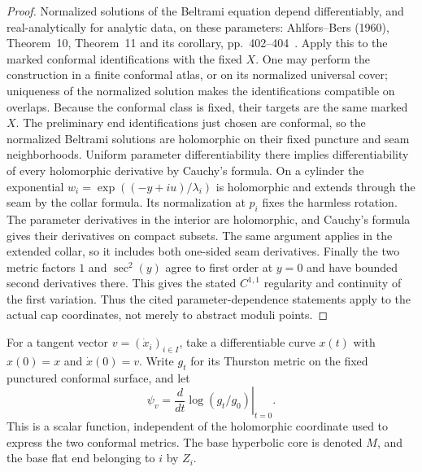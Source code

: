 \begin{proof}
Normalized solutions of the Beltrami equation depend differentiably, and real-analytically for analytic data, on these parameters: Ahlfors--Bers (1960), Theorem~10, Theorem~11 and its corollary, pp.~402--404~\cite{C_AhlforsBers1960}. Apply this to the marked conformal identifications with the fixed $X$. One may perform the construction in a finite conformal atlas, or on its normalized universal cover; uniqueness of the normalized solution makes the identifications compatible on overlaps. Because the conformal class is fixed, their targets are the same marked $X$. The preliminary end identifications just chosen are conformal, so the normalized Beltrami solutions are holomorphic on their fixed puncture and seam neighborhoods. Uniform parameter differentiability there implies differentiability of every holomorphic derivative by Cauchy's formula. On a cylinder the exponential
$w_i=\exp((-y+iu)/\lambda_i)$ is holomorphic and extends through the seam by the collar formula. Its normalization at $p_i$ fixes the harmless rotation. The parameter derivatives in the interior are holomorphic, and Cauchy's formula gives their derivatives on compact subsets. The same argument applies in the extended collar, so it includes both one-sided seam derivatives. Finally the two metric factors $1$ and $\sec^2(y)$ agree to first order at $y=0$ and have bounded second derivatives there. This gives the stated $C^{1,1}$ regularity and continuity of the first variation. Thus the cited parameter-dependence statements apply to the actual cap coordinates, not merely to abstract moduli points.
\end{proof}

For a tangent vector $v=(\dot x_i)_{i\in I}$, take a differentiable curve $x(t)$ with $x(0)=x$ and $\dot x(0)=v$. Write $g_t$ for its Thurston metric on the fixed punctured conformal surface, and let
\[
 \psi_v=\left.\frac{d}{dt}\log(g_t/g_0)\right|_{t=0}.
\]
This is a scalar function, independent of the holomorphic coordinate used to express the two conformal metrics. The base hyperbolic core is denoted $M$, and the base flat end belonging to $i$ by $Z_i$.


